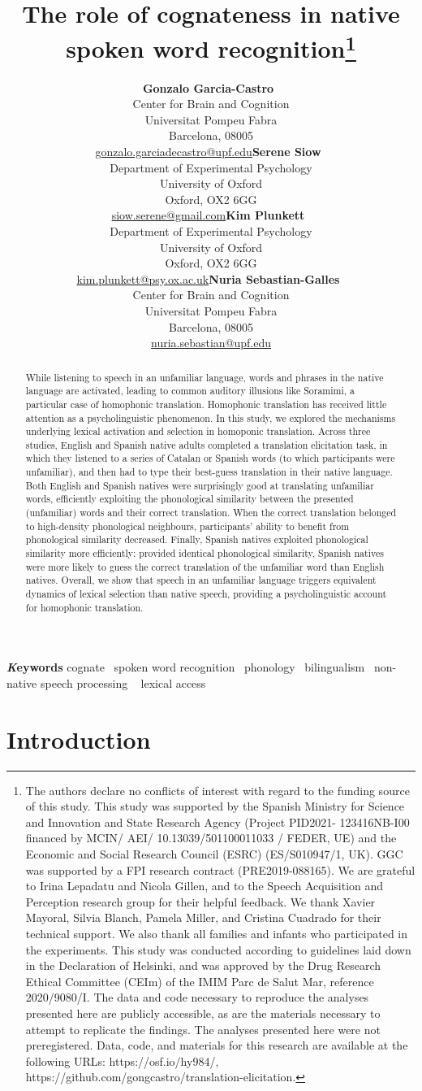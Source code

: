 \documentclass[
]{article}
\title{The role of cognateness in native spoken word
recognition\thanks{The authors declare no conflicts of interest with
regard to the funding source of this study. This study was supported by
the Spanish Ministry for Science and Innovation and State Research
Agency (Project PID2021- 123416NB-I00 financed by MCIN/ AEI/
10.13039/501100011033 / FEDER, UE) and the Economic and Social Research
Council (ESRC) (ES/S010947/1, UK). GGC was supported by a FPI research
contract (PRE2019-088165). We are grateful to Irina Lepadatu and Nicola
Gillen, and to the Speech Acquisition and Perception research group for
their helpful feedback. We thank Xavier Mayoral, Silvia Blanch, Pamela
Miller, and Cristina Cuadrado for their technical support. We also thank
all families and infants who participated in the experiments. This study
was conducted according to guidelines laid down in the Declaration of
Helsinki, and was approved by the Drug Research Ethical Committee (CEIm)
of the IMIM Parc de Salut Mar, reference 2020/9080/I. The data and code
necessary to reproduce the analyses presented here are publicly
accessible, as are the materials necessary to attempt to replicate the
findings. The analyses presented here were not preregistered. Data,
code, and materials for this research are available at the following
URLs: https://osf.io/hy984/,
https://github.com/gongcastro/translation-elicitation.}}
\author{\textbf{Gonzalo
Garcia-Castro}~\orcidlink{0000-0002-8553-4209}\\Center for Brain and
Cognition\\Universitat Pompeu Fabra\\Barcelona,
08005\\\href{mailto:gonzalo.garciadecastro@upf.edu}{gonzalo.garciadecastro@upf.edu}\asep\textbf{Serene
Siow}~\orcidlink{0000-0001-6482-2191}\\Department of Experimental
Psychology\\University of Oxford\\Oxford, OX2
6GG\\\href{mailto:siow.serene@gmail.com}{siow.serene@gmail.com}\asep\textbf{Kim
Plunkett}~\orcidlink{0000-0003-0216-7480}\\Department of Experimental
Psychology\\University of Oxford\\Oxford, OX2
6GG\\\href{mailto:kim.plunkett@psy.ox.ac.uk}{kim.plunkett@psy.ox.ac.uk}\asep\textbf{Nuria
Sebastian-Galles}~\orcidlink{0000-0001-6938-2498}\\Center for Brain and
Cognition\\Universitat Pompeu Fabra\\Barcelona,
08005\\\href{mailto:nuria.sebastian@upf.edu}{nuria.sebastian@upf.edu}}
\date{}
\begin{document}
\maketitle
\begin{abstract}
While listening to speech in an unfamiliar language, words and phrases
in the native language are activated, leading to common auditory
illusions like Soramimi, a particular case of homophonic translation.
Homophonic translation has received little attention as a
psycholinguistic phenomenon. In this study, we explored the mechanisms
underlying lexical activation and selection in homoponic translation.
Across three studies, English and Spanish native adults completed a
translation elicitation task, in which they listened to a series of
Catalan or Spanish words (to which participants were unfamiliar), and
then had to type their best-guess translation in their native language.
Both English and Spanish natives were surprisingly good at translating
unfamiliar words, efficiently exploiting the phonological similarity
between the presented (unfamiliar) words and their correct translation.
When the correct translation belonged to high-density phonological
neighbours, participants' ability to benefit from phonological
similarity decreased. Finally, Spanish natives exploited phonological
similarity more efficiently: provided identical phonological similarity,
Spanish natives were more likely to guess the correct translation of the
unfamiliar word than English natives. Overall, we show that speech in an
unfamiliar language triggers equivalent dynamics of lexical selection
than native speech, providing a psycholinguistic account for homophonic
translation.
\end{abstract}
{\bfseries \emph Keywords}
\def\sep{\textbullet\ }
cognate \sep spoken word
recognition \sep phonology \sep bilingualism \sep non-native speech
processing \sep 
lexical access



\section{Introduction}\label{introduction}
\end{document}
